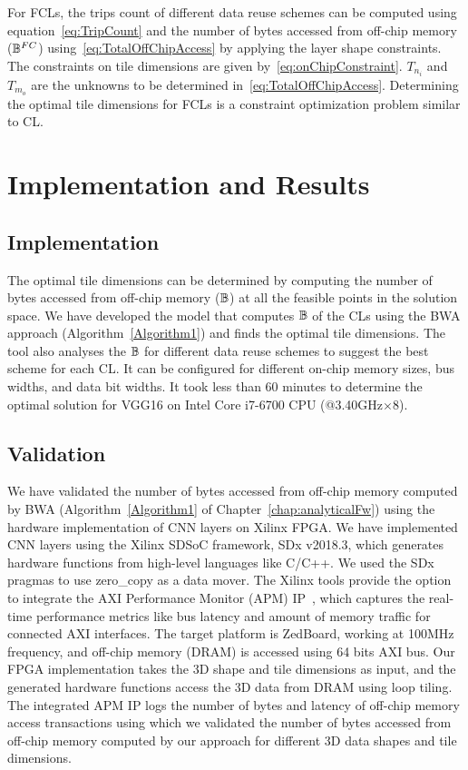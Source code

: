For FCLs, the trips count of different data reuse schemes can be computed using equation~\ref{eq:TripCount} and the number of bytes accessed from off-chip memory ($\mathbb{B}^{FC}$) using~\eqref{eq:TotalOffChipAccess} by applying the layer shape constraints. The constraints on tile dimensions are given by~\eqref{eq:onChipConstraint}. $T_{n_i}$ and $T_{m_o}$ are the unknowns to be determined in~\eqref{eq:TotalOffChipAccess}. Determining the optimal tile dimensions for FCLs is a constraint optimization problem similar to CL.
\section{Implementation and Results}
\subsection{Implementation}
The optimal tile dimensions can be determined by computing the number of bytes accessed from off-chip memory ($\mathbb{B}$) at all the feasible points in the solution space. 
We have developed the model that computes $\mathbb{B}$ of the CLs using the BWA approach (Algorithm~\ref{Algorithm1}) and finds the optimal tile dimensions. The tool also analyses the $\mathbb{B}$ for different data reuse schemes to suggest the best scheme for each CL. It can be configured for different on-chip memory sizes, bus widths, and data bit widths. It took less than 60 minutes to determine the optimal solution for VGG16 on Intel Core i7-6700 CPU (@3.40GHz$\times$8).
\subsection{Validation}\label{Validation}
We have validated the number of bytes accessed from off-chip memory computed by BWA (Algorithm~\ref{Algorithm1} of Chapter~\ref{chap:analyticalFw}) using the hardware implementation of CNN layers on Xilinx FPGA. We have implemented CNN layers using the Xilinx SDSoC framework, SDx v2018.3, which generates hardware functions from high-level languages like C/C++. We used the SDx pragmas to use zero\_copy as a data mover. The Xilinx tools provide the option to integrate the AXI Performance Monitor (APM) IP~\cite{APM}, which captures the real-time performance metrics like bus latency and amount of memory traffic for connected AXI interfaces. The target platform is ZedBoard, working at 100MHz frequency, and off-chip memory (DRAM) is accessed using 64 bits AXI bus. 
Our FPGA implementation takes the 3D shape and tile dimensions as input, and the generated hardware functions access the 3D data from DRAM using loop tiling. The integrated APM IP logs the number of bytes and latency of off-chip memory access transactions using which we validated the number of bytes accessed from off-chip memory computed by our approach for different 3D data shapes and tile dimensions.
